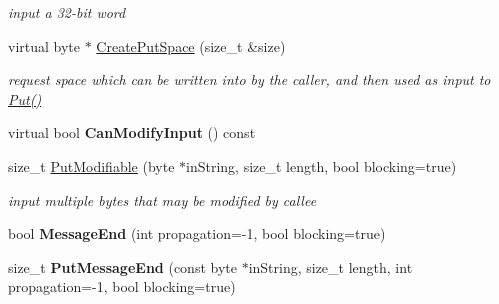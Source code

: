 \begin{DoxyCompactItemize}
\begin{DoxyCompactList}\small\item\em input a 32-\/bit word \item\end{DoxyCompactList}\item 
virtual byte $\ast$ \hyperlink{class_buffered_transformation_af390325c959c3d6a2c03a447d6cd469d}{CreatePutSpace} (size\_\-t \&size)
\begin{DoxyCompactList}\small\item\em request space which can be written into by the caller, and then used as input to \hyperlink{class_buffered_transformation_ae70658b0d271f8e114ac6c3cc9774ede}{Put()} \item\end{DoxyCompactList}\item 
\hypertarget{class_buffered_transformation_ad130a75276220463bd261b3904576385}{
virtual bool {\bfseries CanModifyInput} () const }
\label{class_buffered_transformation_ad130a75276220463bd261b3904576385}

\item 
\hypertarget{class_buffered_transformation_ae15df84a7b67c25dfe2ce0ef5a74123c}{
size\_\-t \hyperlink{class_buffered_transformation_ae15df84a7b67c25dfe2ce0ef5a74123c}{PutModifiable} (byte $\ast$inString, size\_\-t length, bool blocking=true)}
\label{class_buffered_transformation_ae15df84a7b67c25dfe2ce0ef5a74123c}

\begin{DoxyCompactList}\small\item\em input multiple bytes that may be modified by callee \item\end{DoxyCompactList}\item 
\hypertarget{class_buffered_transformation_a20ae0ef2e4ff338b43849e541e9b940f}{
bool {\bfseries MessageEnd} (int propagation=-\/1, bool blocking=true)}
\label{class_buffered_transformation_a20ae0ef2e4ff338b43849e541e9b940f}

\item 
\hypertarget{class_buffered_transformation_aa10b7e626f5af900a4d12f6e5d125891}{
size\_\-t {\bfseries PutMessageEnd} (const byte $\ast$inString, size\_\-t length, int propagation=-\/1, bool blocking=true)}
\label{class_buffered_transformation_aa10b7e626f5af900a4d12f6e5d125891}


\end{DoxyCompactItemize}
